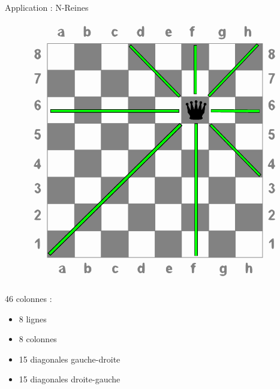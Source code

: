 \documentclass{beamer}
\begin{document}
\begin{frame}{Application : N-Reines}
\begin{figure}[h]
\begin{center}
\includegraphics[height=0.4\textheight]{../imports/8queens.pdf}
\end{center}
\end{figure}

46 colonnes : 
\begin{itemize}
\item 8 lignes
\item 8 colonnes
\item 15 diagonales gauche-droite
\item 15 diagonales droite-gauche
\end{itemize}


\end{frame}
\end{document}
